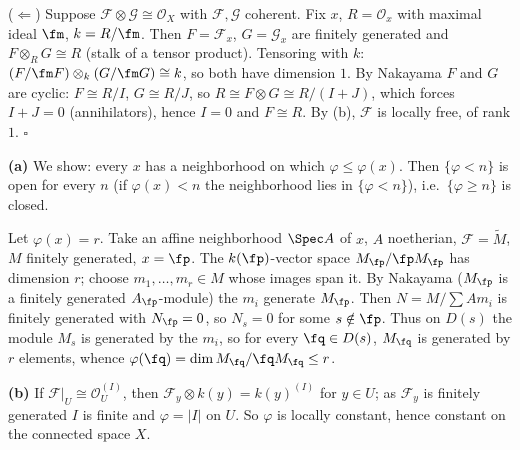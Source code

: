\documentclass[11pt]{article}
\begin{document}
($\Leftarrow$) Suppose $\mathcal F\otimes\mathcal G\cong\mathcal O_X$ with $\mathcal F,\mathcal G$ coherent. Fix $x$, $R=\mathcal O_x$ with maximal ideal $\fm$, $k=R/\fm$. Then $F=\mathcal F_x$, $G=\mathcal G_x$ are finitely generated and $F\otimes_RG\cong R$ (stalk of a tensor product). Tensoring with $k$: $(F/\fm F)\otimes_k(G/\fm G)\cong k$, so both have dimension $1$. By Nakayama $F$ and $G$ are cyclic: $F\cong R/I$, $G\cong R/J$, so $R\cong F\otimes G\cong R/(I+J)$, which forces $I+J=0$ (annihilators), hence $I=0$ and $F\cong R$. By (b), $\mathcal F$ is locally free, of rank $1$. \hfill$\square$

\pf
\textbf{(a)} We show: every $x$ has a neighborhood on which $\varphi\le\varphi(x)$. Then $\{\varphi<n\}$ is open for every $n$ (if $\varphi(x)<n$ the neighborhood lies in $\{\varphi<n\}$), i.e.\ $\{\varphi\ge n\}$ is closed.

Let $\varphi(x)=r$. Take an affine neighborhood $\Spec A$ of $x$, $A$ noetherian, $\mathcal F=\widetilde M$, $M$ finitely generated, $x=\fp$. The $k(\fp)$-vector space $M_\fp/\fp M_\fp$ has dimension $r$; choose $m_1,\dots,m_r\in M$ whose images span it. By Nakayama ($M_\fp$ is a finitely generated $A_\fp$-module) the $m_i$ generate $M_\fp$. Then $N=M/\sum Am_i$ is finitely generated with $N_\fp=0$, so $N_s=0$ for some $s\notin\fp$. Thus on $D(s)$ the module $M_s$ is generated by the $m_i$, so for every $\fq\in D(s)$, $M_\fq$ is generated by $r$ elements, whence $\varphi(\fq)=\dim M_\fq/\fq M_\fq\le r$.

\textbf{(b)} If $\mathcal F|_U\cong\mathcal O_U^{(I)}$, then $\mathcal F_y\otimes k(y)=k(y)^{(I)}$ for $y\in U$; as $\mathcal F_y$ is finitely generated $I$ is finite and $\varphi=|I|$ on $U$. So $\varphi$ is locally constant, hence constant on the connected space $X$.
\end{document}

